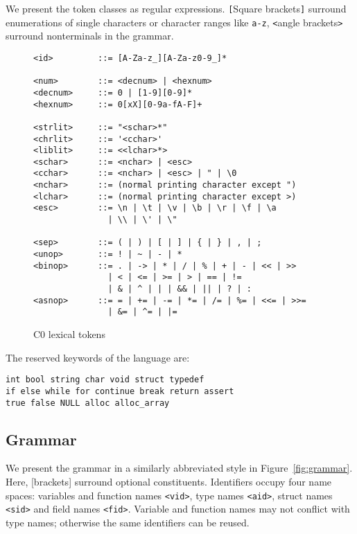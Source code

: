 \documentclass[11pt]{article}
\begin{document}
We present the token classes as regular expressions.  \verb'['Square
brackets\verb']' surround enumerations of single characters or
character ranges like \verb'a-z', \verb'<'angle brackets\verb'>'
surround nonterminals in the grammar.

\begin{figure}
\begin{small}
\begin{verbatim}
<id>         ::= [A-Za-z_][A-Za-z0-9_]*

<num>        ::= <decnum> | <hexnum>
<decnum>     ::= 0 | [1-9][0-9]*
<hexnum>     ::= 0[xX][0-9a-fA-F]+

<strlit>     ::= "<schar>*"
<chrlit>     ::= '<cchar>'
<liblit>     ::= <<lchar>*>
<schar>      ::= <nchar> | <esc>
<cchar>      ::= <nchar> | <esc> | " | \0
<nchar>      ::= (normal printing character except ")
<lchar>      ::= (normal printing character except >)
<esc>        ::= \n | \t | \v | \b | \r | \f | \a 
               | \\ | \' | \"

<sep>        ::= ( | ) | [ | ] | { | } | , | ;
<unop>       ::= ! | ~ | - | *
<binop>      ::= . | -> | * | / | % | + | - | << | >> 
               | < | <= | >= | > | == | !=
               | & | ^ | | | && | || | ? | :
<asnop>      ::= = | += | -= | *= | /= | %= | <<= | >>=
               | &= | ^= | |=
\end{verbatim}
\end{small}
\caption{C0 lexical tokens}
\label{fig:tokens}
\end{figure}

The reserved keywords of the language are:
\begin{verbatim}
int bool string char void struct typedef
if else while for continue break return assert
true false NULL alloc alloc_array
\end{verbatim}

\subsection{Grammar}

We present the grammar in a similarly abbreviated style in
Figure~\ref{fig:grammar}.  Here, [brackets] surround optional
constituents.  Identifiers occupy four name spaces: variables and
function names \verb'<vid>', type names \verb'<aid>', struct names
\verb'<sid>' and field names \verb'<fid>'.  Variable and function
names may not conflict with type names; otherwise the same identifiers
can be reused.
\end{document}
